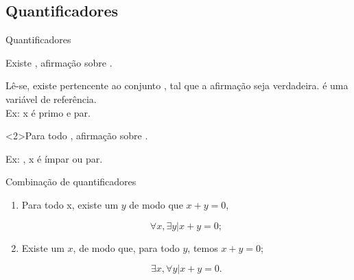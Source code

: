 
\frame{\maketitle}


\subsection{Quantificadores}

\begin{frame}{Quantificadores}{}

\begin{block}{Existe} 
, afirmação sobre .

\bigskip
Lê-se, existe  pertencente ao conjunto , tal 
que a afirmação seja verdadeira.  é uma variável de 
referência.\\

\bigskip
Ex:  x é primo e par.
\end{block}

\begin{block}<2>{Para todo} 
, afirmação sobre .

\bigskip

Ex: , x é ímpar ou par.
\end{block}  

\end{frame}

\begin{frame}{Combinação de quantificadores}

  \begin{enumerate}[<+-| alert@+>]
  \item Para todo x, existe um $y$ de modo que $x+y=0$,
    
    \[\forall x, \exists y | x+y=0;\]
  \item Existe um $x$, de modo que, para todo $y$, temos $x+y=0$;

    \[\exists x, \forall y | x+y=0.\]
  \end{enumerate}
  
\end{frame}


